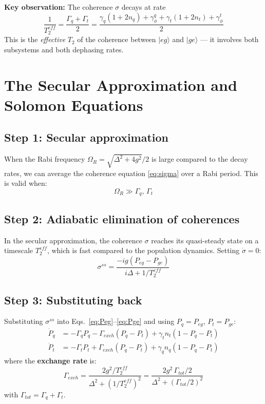 \documentclass[12pt,a4paper]{article}
\newcommand{\gq}{\gamma_q}
\newcommand{\gt}{\gamma_t}
\newcommand{\gph}{\gamma_\phi}
\newcommand{\D}{\Delta}
\begin{document}
\textbf{Key observation:} The coherence $\sigma$ decays at rate
\begin{equation}
    \boxed{
    \frac{1}{T_2^{eff}} = \frac{\Gamma_q + \Gamma_t}{2}
    = \frac{\gq(1+2n_q) + \gph^q + \gt(1+2n_t) + \gph^t}{2}
    }
    \label{eq:T2eff}
\end{equation}
This is the \emph{effective} $T_2$ of the coherence between $|eg\rangle$
and $|ge\rangle$ — it involves both subsystems and both dephasing rates.

\section{The Secular Approximation and Solomon Equations}

\subsection{Step 1: Secular approximation}

When the Rabi frequency $\Omega_R = \sqrt{\D^2 + 4g^2}/2$ is large
compared to the decay rates, we can average the coherence equation
\eqref{eq:sigma} over a Rabi period. This is valid when:
\begin{equation}
    \Omega_R \gg \Gamma_q,\,\Gamma_t
\end{equation}

\subsection{Step 2: Adiabatic elimination of coherences}

In the secular approximation, the coherence $\sigma$ reaches its
quasi-steady state on a timescale $T_2^{eff}$, which is fast compared
to the population dynamics. Setting $\dot\sigma = 0$:
\begin{equation}
    \sigma^{ss} = \frac{-ig(P_{eg} - P_{ge})}{i\D + 1/T_2^{eff}}
    \label{eq:sigma_ss}
\end{equation}

\subsection{Step 3: Substituting back}

Substituting $\sigma^{ss}$ into Eqs.~\eqref{eq:Peg}--\eqref{eq:Pge}
and using $P_q = P_{eg}$, $P_t = P_{ge}$:
\begin{align}
    \dot{P}_q &= -\Gamma_q P_q - \Gamma_{exch}(P_q - P_t)
                 + \gt n_t(1 - P_q - P_t) \\
    \dot{P}_t &= -\Gamma_t P_t + \Gamma_{exch}(P_q - P_t)
                 + \gq n_q(1 - P_q - P_t)
\end{align}
where the \textbf{exchange rate} is:
\begin{equation}
    \boxed{
    \Gamma_{exch} = \frac{2g^2 / T_2^{eff}}{\D^2 + (1/T_2^{eff})^2}
    = \frac{2g^2\,\Gamma_{tot}/2}{\D^2 + (\Gamma_{tot}/2)^2}
    }
    \label{eq:Gamma_exch}
\end{equation}
with $\Gamma_{tot} = \Gamma_q + \Gamma_t$.
\end{document}
